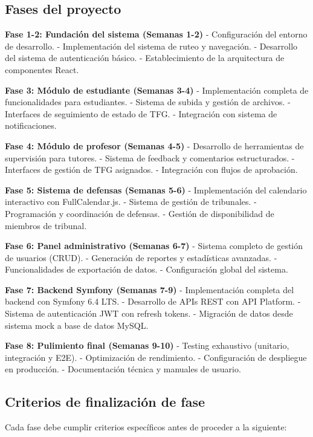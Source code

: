 \documentclass[12pt,a4paper,oneside]{report}
\begin{document}
\subsection{Fases del proyecto}\label{fases-del-proyecto}

\textbf{Fase 1-2: Fundación del sistema (Semanas 1-2)} - Configuración
del entorno de desarrollo. - Implementación del sistema de ruteo y
navegación. - Desarrollo del sistema de autenticación básico. -
Establecimiento de la arquitectura de componentes React.

\textbf{Fase 3: Módulo de estudiante (Semanas 3-4)} - Implementación
completa de funcionalidades para estudiantes. - Sistema de subida y
gestión de archivos. - Interfaces de seguimiento de estado de TFG. -
Integración con sistema de notificaciones.

\textbf{Fase 4: Módulo de profesor (Semanas 4-5)} - Desarrollo de
herramientas de supervisión para tutores. - Sistema de feedback y
comentarios estructurados. - Interfaces de gestión de TFG asignados. -
Integración con flujos de aprobación.

\textbf{Fase 5: Sistema de defensas (Semanas 5-6)} - Implementación del
calendario interactivo con FullCalendar.js. - Sistema de gestión de
tribunales. - Programación y coordinación de defensas. - Gestión de
disponibilidad de miembros de tribunal.

\textbf{Fase 6: Panel administrativo (Semanas 6-7)} - Sistema completo
de gestión de usuarios (CRUD). - Generación de reportes y estadísticas
avanzadas. - Funcionalidades de exportación de datos. - Configuración
global del sistema.

\textbf{Fase 7: Backend Symfony (Semanas 7-9)} - Implementación completa
del backend con Symfony 6.4 LTS. - Desarrollo de APIs REST con API
Platform. - Sistema de autenticación JWT con refresh tokens. - Migración
de datos desde sistema mock a base de datos MySQL.

\textbf{Fase 8: Pulimiento final (Semanas 9-10)} - Testing exhaustivo
(unitario, integración y E2E). - Optimización de rendimiento. -
Configuración de despliegue en producción. - Documentación técnica y
manuales de usuario.

\subsection{Criterios de finalización de
fase}\label{criterios-de-finalizaciuxf3n-de-fase}

Cada fase debe cumplir criterios específicos antes de proceder a la
siguiente:
\end{document}
